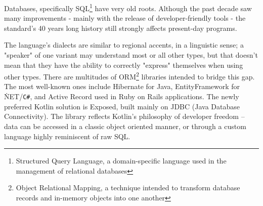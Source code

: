 Databases, specifically SQL\footnote{Structured Query Language, a domain-specific language used in the management of relational databases} have very old roots. Although the past decade saw many improvements - mainly with the release of developer-friendly tools - the standard's 40 years long history still strongly affects present-day programs.


The language's dialects are similar to regional accents, in a linguistic sense; a "speaker" of one variant may understand most or all other types, but that doesn't mean that they have the ability to correctly "express" themselves when using other types. There are multitudes of ORM\footnote{Object Relational Mapping, a technique intended to transform database records and in-memory objects into one another} libraries intended to bridge this gap. The most well-known ones include Hibernate for Java, EntityFramework for \.NET/\texttt{C\#}, and Active Record used in Ruby on Rails applications. The newly preferred Kotlin solution is Exposed, built mainly on JDBC (Java Database Connectivity). The library reflects Kotlin's philosophy of developer freedom -- data can be accessed in a classic object oriented manner, or through a custom language highly reminiscent of raw SQL.~\cite{ExposedDocs}



